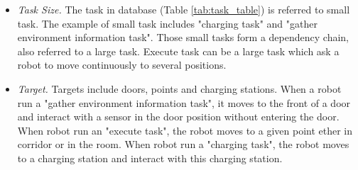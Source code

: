 \begin{table}[htb]
\centering
{}
\caption{Task Specifications Part 1}
\label{tab:task_specifications_difference}
\end{table}

\begin{table}[htb]
\centering
{}
\caption{Task Specifications Part 2}
\label{tab:task_specifications_common}
\end{table}


\begin{table}[htb]
\centering
{}
\caption{Task Table in Database}
\label{tab:task_table}
\end{table}

\begin{itemize}
	\item \textsl{Task Size.} The task in database (Table \ref{tab:task_table}) is referred to small task. The example of small task includes "charging task" and "gather environment information task". 
	Those small tasks form a dependency chain, also referred to a large task. Execute task can be a large task which ask a robot to move continuously to several positions.
	\item \textsl{Target.} Targets include doors, points and charging stations. When a robot run a "gather environment information task", it moves to the front of a door and interact with a sensor in the door position without entering the door. 
	When robot run an "execute task", the robot moves to a given point ether in corridor or in the room.
	When robot run a "charging task", the robot moves to a charging station and interact with this charging station.
\end{itemize}

